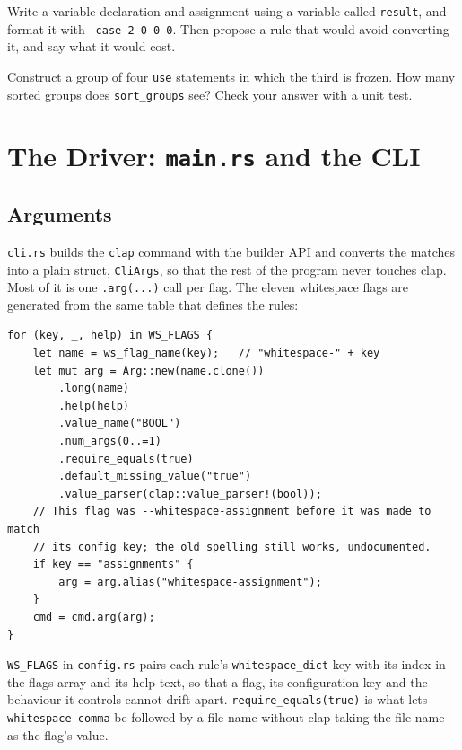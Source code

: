 \documentclass[11pt,a4paper,openany]{book}
\newcommand{\code}[1]{\texttt{\small #1}}
\newcommand{\file}[1]{\texttt{\small\color{accent}#1}}
\newcounter{exercise}[chapter]
\begin{document}
\begin{exercise}
Write a variable declaration and assignment using a variable called
\code{result}, and format it with \code{--case 2 0 0 0}. Then propose a rule
that would avoid converting it, and say what it would cost.
\end{exercise}

\begin{exercise}
Construct a group of four \code{use} statements in which the third is frozen.
How many sorted groups does \code{sort\_groups} see? Check your answer with a
unit test.
\end{exercise}

\chapter{The Driver: \texttt{main.rs} and the CLI}\label{ch:driver}

\section{Arguments}

\file{cli.rs} builds the \code{clap} command with the builder API and converts
the matches into a plain struct, \code{CliArgs}, so that the rest of the
program never touches clap. Most of it is one \code{.arg(...)} call per flag.
The eleven whitespace flags are generated from the same table that defines the
rules:

\begin{lstlisting}[style=rust]
for (key, _, help) in WS_FLAGS {
    let name = ws_flag_name(key);   // "whitespace-" + key
    let mut arg = Arg::new(name.clone())
        .long(name)
        .help(help)
        .value_name("BOOL")
        .num_args(0..=1)
        .require_equals(true)
        .default_missing_value("true")
        .value_parser(clap::value_parser!(bool));
    // This flag was --whitespace-assignment before it was made to match
    // its config key; the old spelling still works, undocumented.
    if key == "assignments" {
        arg = arg.alias("whitespace-assignment");
    }
    cmd = cmd.arg(arg);
}
\end{lstlisting}

\code{WS\_FLAGS} in \file{config.rs} pairs each rule's \code{whitespace\_dict}
key with its index in the flags array and its help text, so that a flag, its
configuration key and the behaviour it controls cannot drift apart.
\code{require\_equals(true)} is what lets \code{-{}-whitespace-comma} be followed
by a file name without clap taking the file name as the flag's value.
\end{document}
